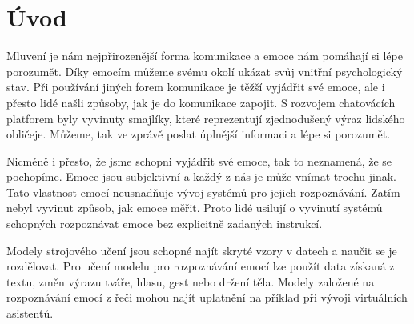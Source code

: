 \documentclass[FM,BP]{tulthesis}
\begin{document}

\begin{abstractCZ}
\end{abstractCZ}

\begin{keywordsCZ}
\end{keywordsCZ}

\vspace{2cm}

\begin{abstractEN}
\end{abstractEN}

\begin{keywordsEN}
\end{keywordsEN}

\clearpage

\begin{acknowledgement}
\end{acknowledgement}

\tableofcontents

\clearpage

\begin{abbrList}
\end{abbrList}

\chapter{Úvod}
Mluvení je nám nejpřirozenější forma komunikace a emoce nám pomáhají si lépe porozumět. Díky emocím můžeme svému okolí ukázat svůj vnitřní psychologický stav. Při používání jiných forem komunikace je těžší vyjádřit své emoce, ale i přesto lidé našli způsoby, jak je do komunikace zapojit. S rozvojem chatovácích platforem byly vyvinuty smajlíky, které reprezentují zjednodušený výraz lidského obličeje. Můžeme, tak ve zprávě poslat úplnější informaci a lépe si porozumět.\cite{DBLP:journals/speech/AkcayO20}

Nicméně i přesto, že jsme schopni vyjádřit své emoce, tak to neznamená, že se pochopíme. Emoce jsou subjektivní a každý z nás je může vnímat trochu jinak. Tato vlastnost emocí neusnadňuje vývoj systémů pro jejich rozpoznávání. Zatím nebyl vyvinut způsob, jak emoce měřit. Proto lidé usilují o vyvinutí systémů schopných rozpoznávat emoce bez explicitně zadaných instrukcí.

Modely strojového učení jsou schopné najít skryté vzory v datech a naučit se je rozdělovat. Pro učení modelu pro rozpoznávání emocí lze použít data získaná z textu, změn výrazu tváře, hlasu, gest nebo držení těla.\cite{konar_chakraborty_2015} Modely založené na rozpoznávání emocí z řeči mohou najít uplatnění na příklad při vývoji virtuálních asistentů. 
\end{document}
